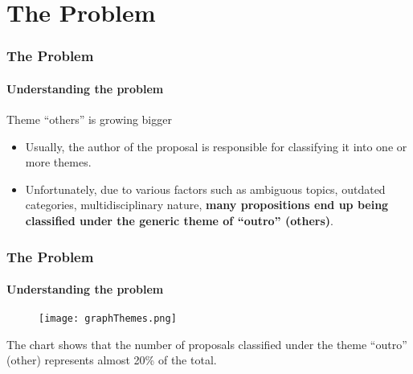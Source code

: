 \section{The Problem}
\begin{frame}
	\frametitle{The Problem}
	\framesubtitle{Understanding the problem}
	
	
	\begin{alertblock}{Theme ``others'' is growing bigger}
		\begin{itemize}
			\item 	Usually, the author of the proposal is responsible for classifying it into one or more themes.
			
			
			\item Unfortunately, due to various factors such as ambiguous topics, outdated categories, multidisciplinary nature, \textbf{many propositions end up being classified under the generic theme of ``outro'' (others)}.
			
			
		\end{itemize}
	\end{alertblock}	
\end{frame}
\begin{frame}
	\frametitle{The Problem}
	\framesubtitle{Understanding the problem}	
	\begin{figure}
		\texttt{[image: graphThemes.png]}
	\end{figure}


	\begin{block}{}
		\scriptsize
		The chart shows that the number of proposals classified under the theme ``outro'' (other) represents almost 20\% of the total. 
	\end{block}	


\end{frame}
